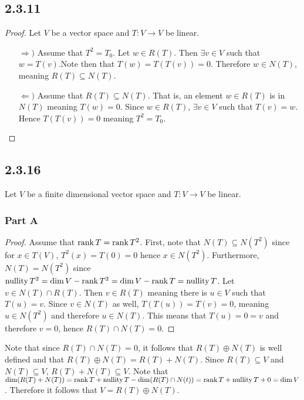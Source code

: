 \documentclass[12pt,titlepage]{extarticle}
\begin{document}
\subsection*{2.3.11}
\begin{proof}
    Let $V$ be a vector space and $T : V \to V$ be linear.
    \begin{enumerate}
        \item[$\Rightarrow)$] %
        Assume that $T^2 = T_0$. Let $w \in R(T)$. Then $\exists v \in V$ such that $w = T(v)$.Note then that $T(w) = T(T(v)) = 0$. Therefore $w \in N(T)$, meaning $R(T) \subseteq N(T)$.
        \item[$\Leftarrow)$] %
        Assume that $R(T) \subseteq N(T)$. That is, an element $w \in R(T)$ is in $N(T)$ meaning $T(w) = 0$. Since $w \in R(T)$, $\exists v \in V$ such that $T(v) = w$. Hence $T(T(v)) = 0$ meaning $T^2 = T_0$.
    \end{enumerate}
\end{proof}

\subsection*{2.3.16}
Let $V$ be a finite dimensional vector space and $T : V \to V$ be linear.

\subsubsection*{Part A}
\begin{proof}
    Assume that $\rank T = \rank T^2$. First, note that $N(T) \subseteq N(T^2)$ since for $x \in T(V)$, $T^2(x) = T(0) = 0$ hence $x \in N(T^2)$. Furthermore, $N(T) = N(T^2)$ since $\operatorname{nullity} T^2 = \dim V - \rank T^2 = \dim V - \rank T = \operatorname{nullity} T$. Let $v \in N(T) \cap R(T)$. Then $v \in R(T)$ meaning there is $u \in V$ such that $T(u) = v$. Since $v \in N(T)$ as well, $T(T(u)) = T(v) = 0$, meaning $u \in N(T^2)$ and therefore $u \in N(T)$. This means that $T(u) = 0 = v$ and therefore $v = 0$, hence $R(T) \cap N(T) = \qty{0}$.
\end{proof}

Note that since $R(T) \cap N(T) = \qty{0}$, it follows that $R(T) \oplus N(T)$ is well defined and that $R(T) \oplus N(T) = R(T) + N(T)$. Since $R(T) \subseteq V$ and $N(T)\subseteq V$, $R(T) + N(T) \subseteq V$. Note that $\dim(R(T) + N(T)) = \rank T + \operatorname{nullity} T - \dim(R(T) \cap N(t)) = \rank T + \operatorname{nullity} T + 0 = \dim V$. Therefore it follows that $V = R(T) \oplus N(T)$.
\end{document}
